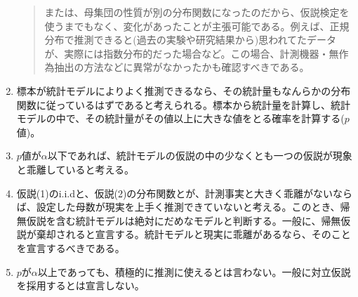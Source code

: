 \begin{framed}
\begin{enumerate}
\begin{quote}
            または、母集団の性質が別の分布関数になったのだから、仮説検定を使うまでもなく、変化があったことが主張可能である。例えば、正規分布で推測できると(過去の実験や研究結果から)思われてたデータが、実際には指数分布的だった場合など。この場合、計測機器・無作為抽出の方法などに異常がなかったかも確認すべきである。
        \end{quote}
        \item 標本が統計モデルによりよく推測できるなら、その統計量もなんらかの分布関数に従っているはずであると考えられる。標本から統計量を計算し、統計モデルの中で、その統計量がその値以上に大きな値をとる確率を計算する($p$値)。
        \item $p$値が$\alpha$以下であれば、統計モデルの仮説の中の少なくとも一つの仮説が現象と乖離していると考える。
        \item 仮説(1)のi.i.dと、仮説(2)の分布関数とが、計測事実と大きく乖離がないならば、設定した母数が現実を上手く推測できていないと考える。このとき、帰無仮説を含む統計モデルは絶対にだめなモデルと判断する。一般に、帰無仮説が棄却されると宣言する。統計モデルと現実に乖離があるなら、そのことを宣言するべきである。
        \item $p$が$\alpha$以上であっても、積極的に推測に使えるとは言わない。一般に対立仮説を採用するとは宣言しない。
    \end{enumerate}
\end{framed}


